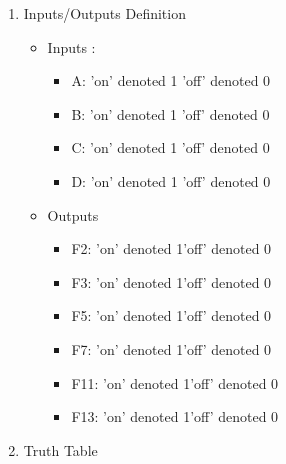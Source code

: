 \begin{enumerate}
\item Inputs/Outputs  Definition
\begin{itemize}
\item Inputs :
\begin{itemize}
\item A: \qquad 'on' denoted 1 \qquad 'off' denoted 0 
\item B: \qquad 'on' denoted 1 \qquad 'off' denoted 0 
\item C: \qquad 'on' denoted 1 \qquad 'off' denoted 0 
\item D: \qquad 'on' denoted 1 \qquad 'off' denoted 0 
\end{itemize}
\item Outputs 
\begin{itemize}
\item F2: \qquad 'on' denoted 1\qquad 'off' denoted  0
\item F3: \qquad 'on' denoted 1\qquad 'off' denoted  0
\item F5: \qquad 'on' denoted 1\qquad 'off' denoted  0
\item F7: \qquad 'on' denoted 1\qquad 'off' denoted  0
\item F11: \qquad 'on' denoted 1\qquad 'off' denoted  0
\item F13: \qquad 'on' denoted 1\qquad 'off' denoted  0
\end{itemize}
\end{itemize}
\item Truth Table 

        \begin{tabular}{|c|c|c|c|c||c|c|c|c|c|c|}

    \toprule


\end{tabular}
\end{enumerate}
